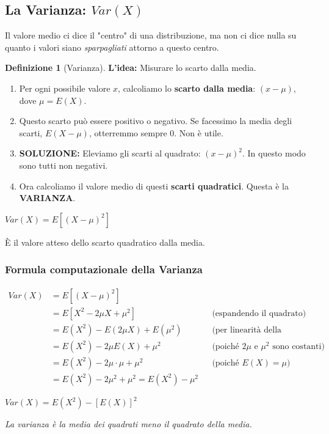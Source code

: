 \documentclass[a4paper, 11pt]{article}
\theoremstyle{definition}
\newtheorem{definizione}{Definizione}[section]
\begin{document}
\subsection{La Varianza: $Var(X)$}
Il valore medio ci dice il "centro" di una distribuzione, ma non ci dice nulla su quanto i valori siano \textit{sparpagliati} attorno a questo centro.

\begin{definizione}[Varianza]
\textbf{L'idea:} Misurare lo scarto dalla media.
\begin{enumerate}
    \item Per ogni possibile valore $x$, calcoliamo lo \textbf{scarto dalla media}: $(x-\mu)$, dove $\mu = E(X)$.
    \item Questo scarto può essere positivo o negativo. Se facessimo la media degli scarti, $E(X-\mu)$, otterremmo sempre 0. Non è utile.
    \item \textbf{SOLUZIONE:} Eleviamo gli scarti al quadrato: $(x-\mu)^2$. In questo modo sono tutti non negativi.
    \item Ora calcoliamo il valore medio di questi \textbf{scarti quadratici}. Questa è la \textbf{VARIANZA}.
\end{enumerate}
\begin{formulabox}
    $Var(X) = E[(X-\mu)^2]$
\end{formulabox}
È il valore atteso dello scarto quadratico dalla media.
\end{definizione}

\subsubsection{Formula computazionale della Varianza}
\begin{align*}
    Var(X) &= E[(X-\mu)^2] \\
           &= E[X^2 - 2\mu X + \mu^2] && \text{(espandendo il quadrato)} \\
           &= E(X^2) - E(2\mu X) + E(\mu^2) && \text{(per linearità della media)} \\
           &= E(X^2) - 2\mu E(X) + \mu^2 && \text{(poiché $2\mu$ e $\mu^2$ sono costanti)} \\
           &= E(X^2) - 2\mu \cdot \mu + \mu^2 && \text{(poiché $E(X)=\mu$)} \\
           &= E(X^2) - 2\mu^2 + \mu^2 = E(X^2) - \mu^2
\end{align*}
\begin{formulabox}
    $Var(X) = E(X^2) - [E(X)]^2$
\end{formulabox}
\textit{La varianza è la media dei quadrati meno il quadrato della media.}
\end{document}
